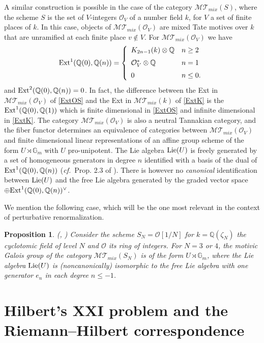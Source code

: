 \documentclass[10pt]{amsart}
\newcommand{\bG}{\mathbb{G}}
\def\Q{{\mathbb Q}}
\def\M{{\mathcal M}}
\renewcommand{\O}{{\mathcal O}}
\def\sT{{\mathcal T}}
\def\Ext{{\rm Ext}}
\def\Lie{{\rm Lie}}
\newcommand{\cf}{{\it cf.\/}\ }
\newtheorem{prop}[thm]{Proposition}
\numberwithin{equation}{section}
\begin{document}
A similar construction is possible in the case of the category
$\M\sT_{mix}(S)$, where the scheme $S$ is the set of
$V$-integers $\O_V$ of a number field $k$, for $V$ a set of finite
places of $k$. In this case, objects of $\M\sT_{mix}(\O_V)$ are
mixed Tate motives over $k$ that are unramified at each finite place
$v\notin V$. For $\M\sT_{mix}(\O_V)$ we have
\begin{equation}\label{ExtOS}
\Ext^1(\Q(0),\Q(n))=\left\{ \begin{array}{ll} K_{2n-1}(k)\otimes
\Q & n\geq 2 \\[2mm] \O_V^*\otimes \Q & n=1 \\[2mm] 0 & n\leq 0.
\end{array} \right.
\end{equation}
and $\Ext^2(\Q(0),\Q(n))=0$.
In fact, the difference between the Ext in $\M\sT_{mix}(\O_V)$ of
\eqref{ExtOS} and the Ext in $\M\sT_{mix}(k)$ of
\eqref{ExtK} is the $\Ext^1(\Q(0),\Q(1))$ which is
finite dimensional in \eqref{ExtOS} and
infinite dimensional in \eqref{ExtK}.
The category $\M\sT_{mix}(\O_V)$ is also a neutral Tannakian category,
and the fiber functor determines an equivalence of categories
between $\M\sT_{mix}(\O_V)$ and
finite dimensional linear representations of an affine group scheme
of the form $U  \rtimes \bG_m$ with $U$ pro-unipotent.
The Lie algebra $\Lie(U)$
is freely generated by a set of homogeneous generators in degree
$n$ identified with a basis of the dual of $\Ext^1(\Q(0),\Q(n))$
(\cf Prop. 2.3 of \cite{dg}). There is however no {\em canonical}
identification between $\Lie(U)$ and the free Lie algebra
generated by the graded vector space $\oplus
\Ext^1(\Q(0),\Q(n))^\vee$.

\smallskip

We mention the following case,
which will be the one most relevant in the context of perturbative
renormalization.

\begin{prop}\label{SNmotives} {\em (\cite{dg}, \cite{Gon})}
Consider the scheme $S_N=\O[1/N]$ for $k=\Q(\zeta_N)$ the
cyclotomic field of level $N$ and $\O$ its ring of integers.
For $N=3$ or $4$, the motivic Galois group of the category
$\M\sT_{mix}(S_N)$ is of the form $U  \rtimes \bG_m$, where
the Lie algebra $\Lie(U)$ is (noncanonically)
isomorphic to the free Lie algebra with one generator $e_n$ in each
degree $n\leq -1$.
\end{prop}


\section{Hilbert's XXI problem and the Riemann--Hilbert
correspondence}
\end{document}
